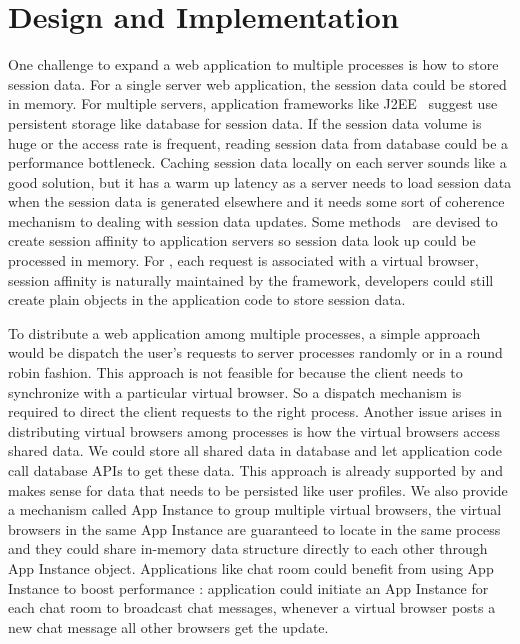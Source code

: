 \section{Design and Implementation}
\label{sec:implementation}
One challenge to expand a web application to multiple processes is 
how to store session data.
For a single server web application, 
the session data could be stored in memory.
For multiple servers,
application frameworks like J2EE~\cite{j2eedoc} suggest use persistent
storage like database for session data.
If the session data volume is huge or the access rate is frequent,
reading session data from database could be a performance bottleneck.
Caching session data locally on each server sounds like a good solution,
but it has a warm up latency as a server needs to load session data when 
the session data is generated elsewhere
and it needs some sort of coherence mechanism to dealing with session data updates.
Some methods~\cite{shachor2005maintaining} are devised to create session affinity
to application servers so session data look up could be processed in memory.
For \cb{}, 
each request is associated with a virtual browser,
session affinity is naturally maintained by the framework,
developers could still create plain \js{} objects in the application code to 
store session data.




To distribute a web application among multiple processes, 
a simple approach would be dispatch the user's requests to server processes randomly or in a round robin fashion.
This approach is not feasible for \cb{} because 
the client needs to synchronize with a particular virtual browser.
So a dispatch mechanism is required to direct the client requests to the right process.
Another issue arises in distributing virtual browsers among processes is 
how the virtual browsers access shared data.
We could store all shared data in database and let application code call database APIs to get these data.
This approach is already supported by \cb{} and makes sense for data that needs to be persisted like user profiles. 
We also provide a mechanism called App Instance to group multiple virtual browsers,
the virtual browsers in the same App Instance are guaranteed to locate in the same process and they could
share in-memory data structure directly to each other through App Instance object.
Applications like chat room could benefit from using App Instance to boost performance :
application could initiate an App Instance for each chat room to broadcast chat messages, 
whenever a virtual browser posts a new chat message all other browsers get the update.



